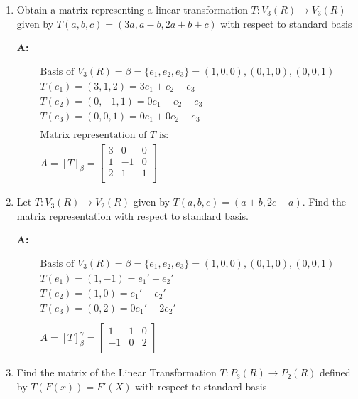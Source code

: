 \documentclass[english,course,fleqn]{lecture}
\newenvironment{qanda}{\begin{enumerate}\setlength{\parindent}{0pt}}{\medskip\end{enumerate}}
\newcommand{\Q}{\bigskip\bfseries \item}
\newcommand{\A}{\par\textbf{A:} \normalfont}
\begin{document}
\begin{qanda}

  \Q Obtain a matrix representing a linear transformation $T:V_{3}(R) \rightarrow V_{3}(R)$
  given by $T(a,b,c) = (3a, a-b, 2a + b + c)$ with respect to standard basis

  \A 

  \begin{gather*}
    \text{Basis of } V_{3}(R) = \beta = \{e_{1}, e_{2}, e_{3}\} = {(1,0,0), (0,1,0), (0,0,1)}\\
    T(e_{1}) = (3,1,2) = 3e_{1} + e_{2} + e_{3}\\
    T(e_{2}) = (0,-1,1) = 0e_{1} - e_{2} + e_{3}\\
    T(e_{3}) = (0,0,1) = 0e_{1} + 0e_{2} + e_{3}\\
    \\
    \text{Matrix representation of $T$ is:}\\
    A = {[T]}_{\beta} = \begin{bmatrix}
      3 & 0 & 0 \\
      1 & -1 & 0 \\
      2 & 1 & 1 \\
    \end{bmatrix}
  \end{gather*}

  \Q Let $T:V_{3}(R) \rightarrow V_{2}(R)$ given by $T(a,b,c) = (a+b, 2c-a)$. Find the matrix representation with respect to standard basis.

  \A 

  \begin{gather*}
    \text{Basis of } V_{3}(R) = \beta = \{e_{1}, e_{2}, e_{3}\} = {(1,0,0), (0,1,0), (0,0,1)}\\
    T(e_{1}) = (1,-1) = e_{1}' - e_{2}'\\
    T(e_{2}) = (1,0) = e_{1}' + e_{2}'\\
    T(e_{3}) = (0,2) = 0e_{1}' + 2e_{2}'\\
    \\
    A = {[T]}_{\beta}^{\gamma} = \begin{bmatrix}
      1 & 1 & 0 \\
      -1 & 0 & 2 \\
    \end{bmatrix}
  \end{gather*}

  \Q Find the matrix of the Linear Transformation $T:P_{3}(R) \rightarrow P_{2} (R)$ defined by $T(F(x)) = F'(X)$ with respect to standard basis


\end{qanda}
\end{document}
